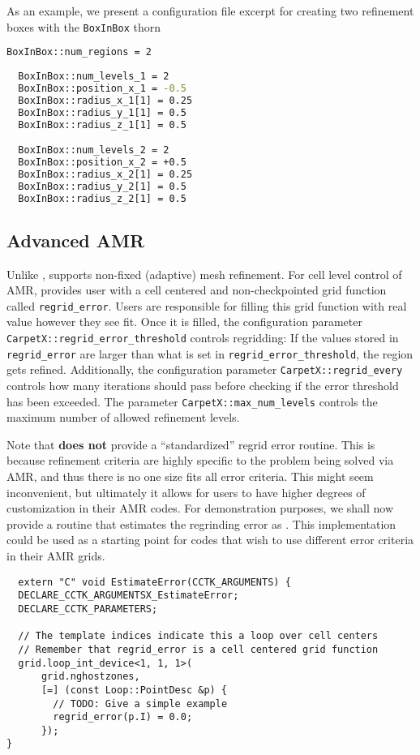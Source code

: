 As an example, we present a configuration file excerpt for creating two refinement boxes with the \texttt{BoxInBox} thorn

\begin{lstlisting}[language=bash]
  BoxInBox::num_regions = 2
  
  BoxInBox::num_levels_1 = 2
  BoxInBox::position_x_1 = -0.5
  BoxInBox::radius_x_1[1] = 0.25
  BoxInBox::radius_y_1[1] = 0.5
  BoxInBox::radius_z_1[1] = 0.5

  BoxInBox::num_levels_2 = 2
  BoxInBox::position_x_2 = +0.5
  BoxInBox::radius_x_2[1] = 0.25
  BoxInBox::radius_y_2[1] = 0.5
  BoxInBox::radius_z_2[1] = 0.5
\end{lstlisting}

\subsection{Advanced AMR}
\label{sec:advanced_amr}

Unlike \Carpet\space, \CarpetX\space supports non-fixed (adaptive) mesh refinement. For cell level control of AMR, \CarpetX\space provides user with a cell centered and non-checkpointed grid function called \texttt{regrid\_error}. Users are responsible for filling this grid function with real value however they see fit. Once it is filled, the configuration parameter \texttt{CarpetX::regrid\_error\_threshold} controls regridding: If the values stored in \texttt{regrid\_error} are larger than what is set in \texttt{regrid\_error\_threshold}, the region gets refined. Additionally, the configuration parameter \texttt{CarpetX::regrid\_every} controls how many iterations should pass before checking if the error threshold has been exceeded. The parameter \texttt{CarpetX::max\_num\_levels} controls the maximum number of allowed refinement levels.

Note that \CarpetX\space \textbf{does not} provide a ``standardized'' regrid error routine. This is because refinement criteria are highly specific to the problem being solved via AMR, and thus there is no one size fits all error criteria. This might seem inconvenient, but ultimately it allows for users to have higher degrees of customization in their AMR codes. For demonstration purposes, we shall now provide a routine that estimates the regrinding error as . This implementation could be used as a starting point for codes that wish to use different error criteria in their AMR grids.

\begin{lstlisting}
  extern "C" void EstimateError(CCTK_ARGUMENTS) {
  DECLARE_CCTK_ARGUMENTSX_EstimateError;
  DECLARE_CCTK_PARAMETERS;

  // The template indices indicate this a loop over cell centers
  // Remember that regrid_error is a cell centered grid function
  grid.loop_int_device<1, 1, 1>(
      grid.nghostzones,
      [=] (const Loop::PointDesc &p) {
        // TODO: Give a simple example
        regrid_error(p.I) = 0.0;
      });
}
\end{lstlisting}


